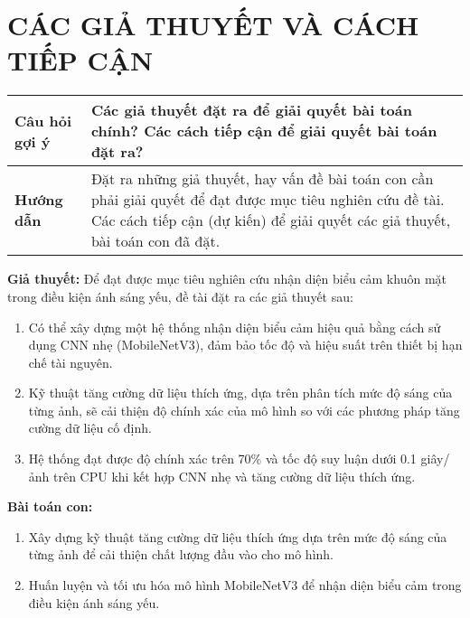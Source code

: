 \section*{CÁC GIẢ THUYẾT VÀ CÁCH TIẾP CẬN}

\begin{tabular}{|p{4cm}|p{11cm}|}
    \hline
    \textbf{Câu hỏi gợi ý} & Các giả thuyết đặt ra để giải quyết bài toán chính? Các cách tiếp cận để giải quyết bài toán đặt ra? \\
    \hline
    \textbf{Hướng dẫn} & Đặt ra những giả thuyết, hay vấn đề bài toán con cần phải giải quyết để đạt được mục tiêu nghiên cứu đề tài. Các cách tiếp cận (dự kiến) để giải quyết các giả thuyết, bài toán con đã đặt. \\
    \hline
\end{tabular}

\medskip

\textbf{Giả thuyết:} Để đạt được mục tiêu nghiên cứu nhận diện biểu cảm khuôn mặt trong điều kiện ánh sáng yếu, đề tài đặt ra các giả thuyết sau:  
\begin{enumerate}
    \item Có thể xây dựng một hệ thống nhận diện biểu cảm hiệu quả bằng cách sử dụng CNN nhẹ (MobileNetV3), đảm bảo tốc độ và hiệu suất trên thiết bị hạn chế tài nguyên.
    \item Kỹ thuật tăng cường dữ liệu thích ứng, dựa trên phân tích mức độ sáng của từng ảnh, sẽ cải thiện độ chính xác của mô hình so với các phương pháp tăng cường dữ liệu cố định.
    \item Hệ thống đạt được độ chính xác trên 70\% và tốc độ suy luận dưới 0.1 giây/ảnh trên CPU khi kết hợp CNN nhẹ và tăng cường dữ liệu thích ứng.
\end{enumerate}

\textbf{Bài toán con:}  
\begin{enumerate}
    \item Xây dựng kỹ thuật tăng cường dữ liệu thích ứng dựa trên mức độ sáng của từng ảnh để cải thiện chất lượng đầu vào cho mô hình.
    \item Huấn luyện và tối ưu hóa mô hình MobileNetV3 để nhận diện biểu cảm trong điều kiện ánh sáng yếu.
\end{enumerate}

